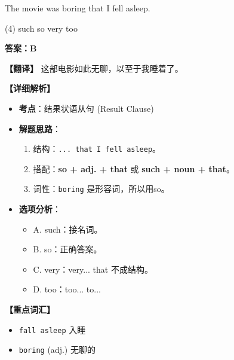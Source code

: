 \documentclass[11pt, a4paper]{article}
\newcommand{\analysis}[4]{
    \begin{solutionbox}
        \textbf{答案：#1}
        
        \textbf{【翻译】} #2
        
        \textbf{【详细解析】}
        #3
        
        \textbf{【重点词汇】}
        #4
    \end{solutionbox}
}
\newcommand{\blank}{\underline{\hspace{1.5cm}}}
\begin{document}
\begin{questions}
    \item The movie was \blank boring that I fell asleep.
    \begin{tasks}(4)
        \task such \task so \task very \task too
    \end{tasks}
    \analysis{B}{这部电影如此无聊，以至于我睡着了。}{
        \begin{itemize}
            \item \textbf{考点}：结果状语从句 (Result Clause)
            \item \textbf{解题思路}：
                \begin{enumerate}
                    \item 结构：\texttt{... that I fell asleep}。
                    \item 搭配：\textbf{so + adj. + that} 或 \textbf{such + noun + that}。
                    \item 词性：\texttt{boring} 是形容词，所以用so。
                \end{enumerate}
            \item \textbf{选项分析}：
                \begin{itemize}
                    \item A. such：接名词。
                    \item B. so：正确答案。
                    \item C. very：very... that 不成结构。
                    \item D. too：too... to...
                \end{itemize}
        \end{itemize}
    }{
        \begin{itemize}
            \item \texttt{fall asleep} 入睡
            \item \texttt{boring} (adj.) 无聊的
        \end{itemize}
    }


\end{questions}
\end{document}
